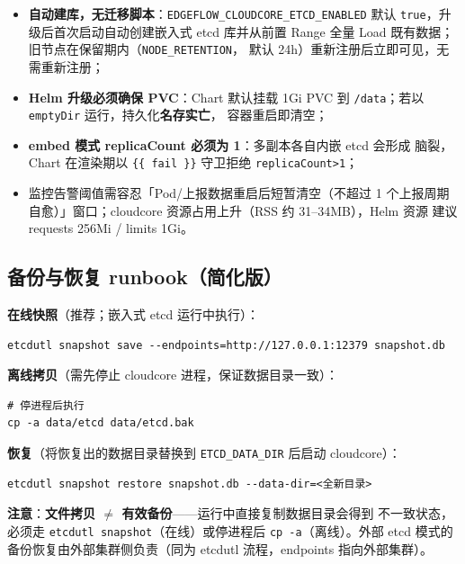 \begin{itemize}
  \item \textbf{自动建库，无迁移脚本}：\texttt{EDGEFLOW\_CLOUDCORE\_ETCD\_ENABLED}
        默认 \texttt{true}，升级后首次启动自动创建嵌入式 etcd 库并从前置
        Range 全量 Load 既有数据；旧节点在保留期内（\texttt{NODE\_RETENTION}，
        默认 24h）重新注册后立即可见，无需重新注册；
  \item \textbf{Helm 升级必须确保 PVC}：Chart 默认挂载 1Gi PVC 到
        \texttt{/data}；若以 \texttt{emptyDir} 运行，持久化\textbf{名存实亡}，
        容器重启即清空；
  \item \textbf{embed 模式 replicaCount 必须为 1}：多副本各自内嵌 etcd 会形成
        脑裂，Chart 在渲染期以 \texttt{\{\{ fail \}\}} 守卫拒绝
        \texttt{replicaCount>1}；
  \item 监控告警阈值需容忍「Pod/上报数据重启后短暂清空（不超过 1 个上报周期
        自愈）」窗口；cloudcore 资源占用上升（RSS 约 31--34MB），Helm 资源
        建议 requests 256Mi / limits 1Gi。
\end{itemize}

\subsection{备份与恢复 runbook（简化版）}

\textbf{在线快照}（推荐；嵌入式 etcd 运行中执行）：

\begin{lstlisting}
etcdutl snapshot save --endpoints=http://127.0.0.1:12379 snapshot.db
\end{lstlisting}

\textbf{离线拷贝}（需先停止 cloudcore 进程，保证数据目录一致）：

\begin{lstlisting}
# 停进程后执行
cp -a data/etcd data/etcd.bak
\end{lstlisting}

\textbf{恢复}（将恢复出的数据目录替换到 \texttt{ETCD\_DATA\_DIR} 后启动
cloudcore）：

\begin{lstlisting}
etcdutl snapshot restore snapshot.db --data-dir=<全新目录>
\end{lstlisting}

\textbf{注意}：\textbf{文件拷贝 $\neq$ 有效备份}——运行中直接复制数据目录会得到
不一致状态，必须走 \texttt{etcdutl snapshot}（在线）或停进程后
\texttt{cp -a}（离线）。外部 etcd 模式的备份恢复由外部集群侧负责（同为
etcdutl 流程，endpoints 指向外部集群）。

